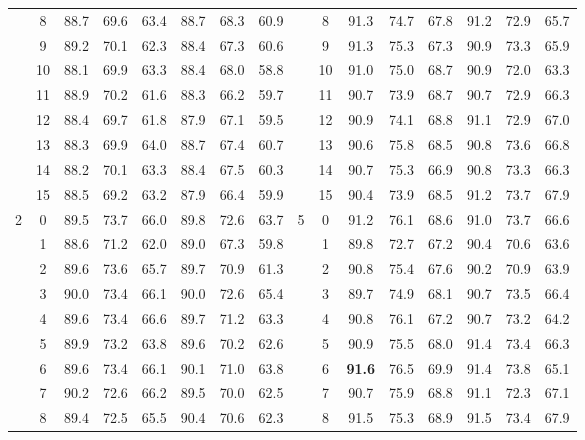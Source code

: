 \begin{table}[p]
{\begin{tabular}{c c | c c c | c c c || c c | c c c | c c c}
             & 8 & 88.7 & 69.6 & 63.4 & 88.7 & 68.3 & 60.9 &  & 8 & 91.3 & 74.7 & 67.8 & 91.2 & 72.9 & 65.7 \\
             & 9 & 89.2 & 70.1 & 62.3 & 88.4 & 67.3 & 60.6 &  & 9 & 91.3 & 75.3 & 67.3 & 90.9 & 73.3 & 65.9 \\
             & 10 & 88.1 & 69.9 & 63.3 & 88.4 & 68.0 & 58.8 &  & 10 & 91.0 & 75.0 & 68.7 & 90.9 & 72.0 & 63.3 \\
             & 11 & 88.9 & 70.2 & 61.6 & 88.3 & 66.2 & 59.7 &  & 11 & 90.7 & 73.9 & 68.7 & 90.7 & 72.9 & 66.3 \\
             & 12 & 88.4 & 69.7 & 61.8 & 87.9 & 67.1 & 59.5 &  & 12 & 90.9 & 74.1 & 68.8 & 91.1 & 72.9 & 67.0 \\
             & 13 & 88.3 & 69.9 & 64.0 & 88.7 & 67.4 & 60.7 &  & 13 & 90.6 & 75.8 & 68.5 & 90.8 & 73.6 & 66.8 \\
             & 14 & 88.2 & 70.1 & 63.3 & 88.4 & 67.5 & 60.3 &  & 14 & 90.7 & 75.3 & 66.9 & 90.8 & 73.3 & 66.3 \\
             & 15 & 88.5 & 69.2 & 63.2 & 87.9 & 66.4 & 59.9 &  & 15 & 90.4 & 73.9 & 68.5 & 91.2 & 73.7 & 67.9 \\
            \midrule
            \multirow{16}{*}{2} & 0 & 89.5 & 73.7 & 66.0 & 89.8 & 72.6 & 63.7 & \multirow{16}{*}{5} & 0 & 91.2 & 76.1 & 68.6 & 91.0 & 73.7 & 66.6 \\
             & 1 & 88.6 & 71.2 & 62.0 & 89.0 & 67.3 & 59.8 &  & 1 & 89.8 & 72.7 & 67.2 & 90.4 & 70.6 & 63.6 \\
             & 2 & 89.6 & 73.6 & 65.7 & 89.7 & 70.9 & 61.3 &  & 2 & 90.8 & 75.4 & 67.6 & 90.2 & 70.9 & 63.9 \\
             & 3 & 90.0 & 73.4 & 66.1 & 90.0 & 72.6 & 65.4 &  & 3 & 89.7 & 74.9 & 68.1 & 90.7 & 73.5 & 66.4 \\
             & 4 & 89.6 & 73.4 & 66.6 & 89.7 & 71.2 & 63.3 &  & 4 & 90.8 & 76.1 & 67.2 & 90.7 & 73.2 & 64.2 \\
             & 5 & 89.9 & 73.2 & 63.8 & 89.6 & 70.2 & 62.6 &  & 5 & 90.9 & 75.5 & 68.0 & 91.4 & 73.4 & 66.3 \\
             & 6 & 89.6 & 73.4 & 66.1 & 90.1 & 71.0 & 63.8 &  & 6 & \textbf{91.6} & 76.5 & 69.9 & 91.4 & 73.8 & 65.1 \\
             & 7 & 90.2 & 72.6 & 66.2 & 89.5 & 70.0 & 62.5 &  & 7 & 90.7 & 75.9 & 68.8 & 91.1 & 72.3 & 67.1 \\
             & 8 & 89.4 & 72.5 & 65.5 & 90.4 & 70.6 & 62.3 &  & 8 & 91.5 & 75.3 & 68.9 & 91.5 & 73.4 & 67.9 \\

\end{tabular}}
\end{table}
